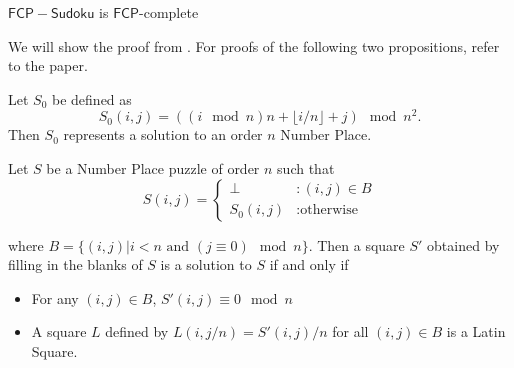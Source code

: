 \documentclass[runningheads,a4paper]{llncs}
\begin{document}
\begin{theorem}
$\mathsf{FCP-Sudoku}$ is $\mathsf{FCP}$-complete
\end{theorem}

We will show the proof from \cite{takayuki2003complexity}. For proofs of the following two propositions, refer to the paper. 

\begin{proposition}
Let $S_0$ be defined as
$$S_0 (i,j) = ((i \mod n) n + \lfloor i/n \rfloor + j) \mod n^2. $$
Then $S_0$ represents a solution to an order $n$ Number Place. 
\end{proposition}

\begin{proposition}
Let $S$ be a Number Place puzzle of order $n$ such that
\begin{displaymath}
S(i,j) = \left\{
\begin{array}{lr}
\perp & : (i,j) \in B\\
S_0 (i,j) & : \text{otherwise}
\end{array}
\right.
\end{displaymath}

where $B = \{ (i,j) | i < n \text{ and } (j \equiv 0) \mod n \}$. Then a square $S'$ obtained by filling in the blanks of $S$ is a solution to $S$ if and only if

\begin{itemize}
\item For any $(i,j) \in B$, $S'(i,j) \equiv 0 \mod n$
\item A square $L$ defined by $L(i, j/n) = S'(i,j)/n$ for all $(i, j) \in B$ is a Latin Square.
\end{itemize}

\end{proposition}
\end{document}
